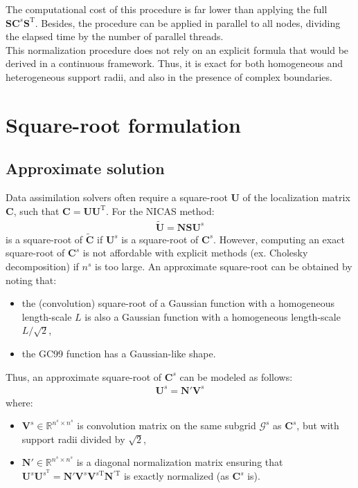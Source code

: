 \documentclass[12pt]{scrartcl}
\begin{document}
The computational cost of this procedure is far lower than applying the full $\mathbf{S} \mathbf{C}^s \mathbf{S}^\mathrm{T}$. Besides, the procedure can be applied in parallel to all nodes, dividing the elapsed time by the number of parallel threads.\\
$  $\\
This normalization procedure does not rely on an explicit formula that would be derived in a continuous framework. Thus, it is exact for both homogeneous and heterogeneous support radii, and also in the presence of complex boundaries.

\section{Square-root formulation}

\subsection{Approximate solution}
Data assimilation solvers often require a square-root $\mathbf{U}$ of the localization matrix $\mathbf{C}$, such that $\mathbf{C} = \mathbf{U} \mathbf{U}^\textrm{T}$. For the NICAS method:
\begin{align}
\widetilde{\mathbf{U}} = \mathbf{N} \mathbf{S} \mathbf{U}^s
\end{align}
is a square-root of $\widetilde{\mathbf{C}}$ if $\mathbf{U}^s$ is a square-root of $\mathbf{C}^s$. However, computing an exact square-root of $\mathbf{C}^s$ is not affordable with explicit methods (ex. Cholesky decomposition) if $n^s$ is too large. An approximate square-root can be obtained by noting that:
\begin{itemize}
\item the (convolution) square-root of a Gaussian function with a homogeneous length-scale $L$ is also a Gaussian function with a homogeneous length-scale $L/\sqrt{2}$,
\item the GC99 function has a Gaussian-like shape.
\end{itemize}
Thus, an approximate square-root of $\mathbf{C}^s$ can be modeled as follows:
\begin{align}
\mathbf{U}^s = \mathbf{N}' \mathbf{V}^s
\end{align}
where:
\begin{itemize}
\item $\mathbf{V}^s \in \mathbb{R}^{n^s \times n^s}$ is convolution matrix on the same subgrid $\mathcal{G}^s$ as $\mathbf{C}^s$, but with support radii divided by $\sqrt{2}$,
\item $\mathbf{N}' \in \mathbb{R}^{n^s \times n^s}$ is a diagonal normalization matrix ensuring that $\mathbf{U}^s \mathbf{U}^{s^\mathrm{T}} = \mathbf{N}' \mathbf{V}^s \mathbf{V}^{s\mathrm{T}} \mathbf{N}^{\prime\textrm{T}}$ is exactly normalized (as $\mathbf{C}^s$ is).
\end{itemize}
\end{document}
